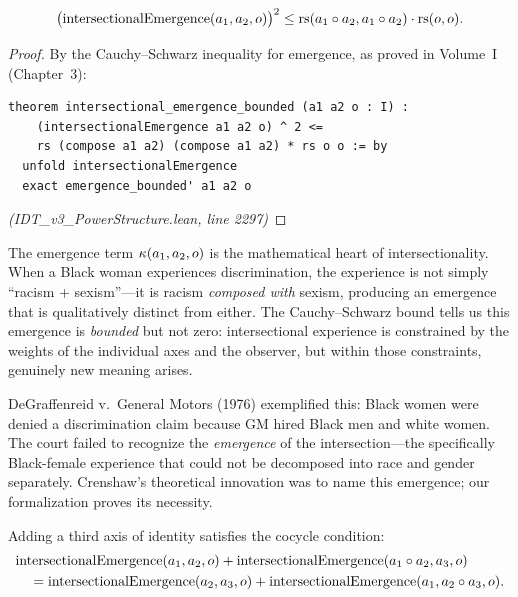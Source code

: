 \begin{theorem}
\label{thm:intersectional-bounded}
\[
  \big(\mathrm{intersectionalEmergence}(a_1, a_2, o)\big)^2 \leq \mathrm{rs}(a_1 \circ a_2, a_1 \circ a_2) \cdot \mathrm{rs}(o, o).
\]
\end{theorem}

\begin{proof}
By the Cauchy--Schwarz inequality for emergence, as proved in Volume~I (Chapter~3):
\begin{lstlisting}
theorem intersectional_emergence_bounded (a1 a2 o : I) :
    (intersectionalEmergence a1 a2 o) ^ 2 <=
    rs (compose a1 a2) (compose a1 a2) * rs o o := by
  unfold intersectionalEmergence
  exact emergence_bounded' a1 a2 o
\end{lstlisting}
\textit{(IDT\_v3\_PowerStructure.lean, line 2297)}
\end{proof}

\begin{interpretation}
The emergence term $\kappa(a_1, a_2, o)$ is the mathematical heart of
intersectionality. When a Black woman experiences discrimination, the
experience is not simply ``racism + sexism''---it is racism
\emph{composed with} sexism, producing an emergence that is qualitatively
distinct from either. The Cauchy--Schwarz bound tells us this emergence is
\emph{bounded} but not zero: intersectional experience is constrained by the
weights of the individual axes and the observer, but within those constraints,
genuinely new meaning arises.

DeGraffenreid v.\ General Motors (1976) exemplified this: Black women were
denied a discrimination claim because GM hired Black men and white women.
The court failed to recognize the \emph{emergence} of the intersection---the
specifically Black-female experience that could not be decomposed into race
and gender separately. Crenshaw's theoretical innovation was to name this
emergence; our formalization proves its necessity.
\end{interpretation}

\begin{theorem}
\label{thm:intersectional-cocycle}
Adding a third axis of identity satisfies the cocycle condition:
\begin{align*}
  &\mathrm{intersectionalEmergence}(a_1, a_2, o)
  + \mathrm{intersectionalEmergence}(a_1 \circ a_2, a_3, o) \\
  &\quad= \mathrm{intersectionalEmergence}(a_2, a_3, o)
  + \mathrm{intersectionalEmergence}(a_1, a_2 \circ a_3, o).
\end{align*}
\end{theorem}

